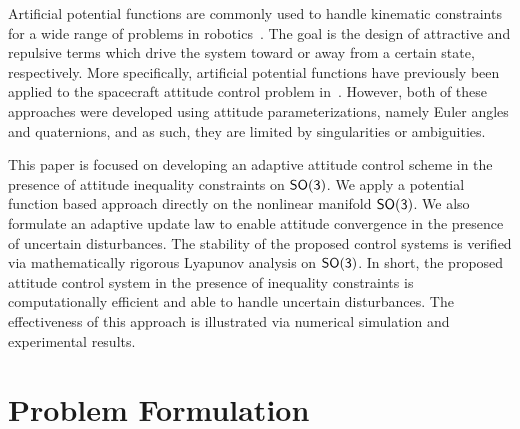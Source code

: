\documentclass[letterpaper, 10 pt, conference]{ieeeconf}  %
\begin{document}

Artificial potential functions are commonly used to handle kinematic constraints for a wide range of problems in robotics~\cite{rimon1992}.
The goal is the design of attractive and repulsive terms which drive the system toward or away from a certain state, respectively.
More specifically, artificial potential functions have previously been applied to the spacecraft attitude control problem in~\cite{lee2011b,mcinnes1994}.
However, both of these approaches were developed using attitude parameterizations, namely Euler angles and quaternions, and as such, they are limited by singularities or ambiguities.

This paper is focused on developing an adaptive attitude control scheme in the presence of attitude inequality constraints on \(\mathsf{SO(3)}\).
We apply a potential function based approach directly on the nonlinear manifold \(\mathsf{SO(3)}\). 
We also formulate an adaptive update law to enable attitude convergence in the presence of uncertain disturbances.
The stability of the proposed control systems is verified via mathematically rigorous Lyapunov analysis on $\mathsf{SO(3)}$. 
In short, the proposed attitude control system in the presence of inequality constraints is computationally efficient and able to handle uncertain disturbances. 
The effectiveness of this approach is illustrated via numerical simulation and experimental results.%


\section{Problem Formulation}\label{sec:prob_form}
\end{document}
